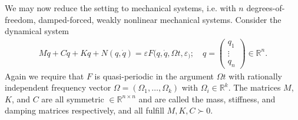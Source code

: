 We may now reduce the setting to mechanical systems, i.e. with $n$ degrees-of-freedom, damped-forced, weakly  nonlinear mechanical systems. Consider the dynamical system
\begin{align} \label{eq9:mech_ssm}
	M \ddot{q} + C \dot{q} + K q + N(q, \dot{q}) = \varepsilon F(q, \dot{q}, \Omega t, \varepsilon_);\quad q = 
	\begin{pmatrix}
		q_1 \\ \vdots \\q_n
	\end{pmatrix} \in \mathbb{R}^{n}.
\end{align}
Again we require that $F$ is quasi-periodic in the argument $\Omega t$ with rationally independent frequency vector $\Omega = (\Omega_1, \ldots, \Omega_k)$ with $\Omega_i\in\mathbb{R}^k$. The matrices $M$, $K$, and $C$ are all symmetric $\in \mathbb{R}^{n\times n}$ and are called the mass, stiffness, and damping matrices respectively, and all fulfill $M,K,C \succ 0$. 

